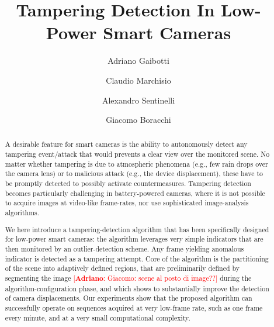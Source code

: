 \documentclass{llncs}
\newcommand{\ad}[1]{{\textcolor{red}{[\small \textbf{Adriano}: #1]}}}
\begin{document}
\title{Tampering Detection In Low-Power Smart Cameras}

\author{Adriano Gaibotti \and Claudio Marchisio \and Alexandro Sentinelli \and Giacomo Boracchi}

\maketitle

\begin{abstract}
A desirable feature for smart cameras is the ability to autonomously detect any tampering event/attack that would prevents a clear view over the monitored scene. No matter whether tampering is due to atmospheric phenomena (e.g., few rain drops over the camera lens) or to malicious attack (e.g., the device displacement), these have to be promptly detected to possibly activate countermeasures. Tampering detection becomes particularly challenging in battery-powered cameras, where it is not possible to acquire images at video-like frame-rates, nor use sophisticated image-analysis algorithms. 

We here introduce a tampering-detection algorithm that has been specifically designed for low-power smart cameras: the algorithm leverages very simple indicators that are then monitored by an outlier-detection scheme. Any frame yielding anomalous indicator is detected as a tampering attempt. Core of the algorithm is the partitioning of the scene into adaptively defined regions, that are preliminarily defined by segmenting the image \ad{Giacomo: scene al posto di image??} during the algorithm-configuration phase, and which shows to substantially improve the detection of camera displacements. Our experiments show that the proposed algorithm can successfully operate on sequences acquired at very low-frame rate, such as one frame every minute, and at a very small computational complexity. %


\end{abstract}
\end{document}
